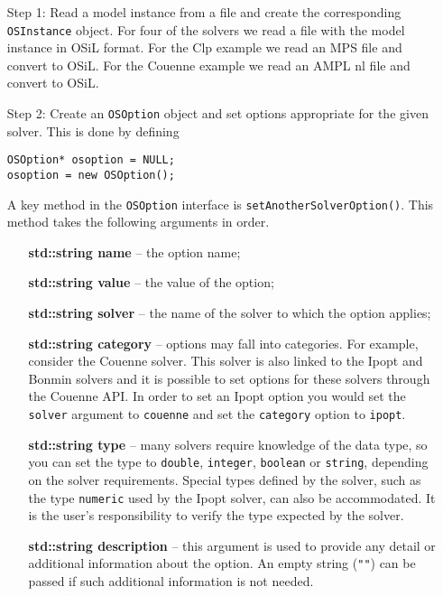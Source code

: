 \documentclass[11pt]{article}
\renewcommand{\_}{{\char"5F}}
\renewcommand{\{}{{\char"7B}}
\renewcommand{\}}{{\char"7D}}
\renewcommand{\^}{{\char"0D}}
\renewcommand{\'}{{\char"0D}}
\begin{document}
\begin{itemize}
\item[Step 1:]  Read a model instance from a file  and create the corresponding {\tt OSInstance} object.
For four of the solvers we read a file with the model instance in OSiL format. For the Clp example 
we read an MPS file and convert to OSiL. For the Couenne example we read an AMPL nl file and convert 
to OSiL.

\item[Step 2:]  Create an {\tt OSOption} object and set options appropriate for the given solver.   
This is done by defining

\begin{verbatim}
OSOption* osoption = NULL;
osoption = new OSOption();
\end{verbatim}

A key method in the {\tt OSOption} interface is {\tt setAnotherSolverOption()}.  This method 
takes the following arguments in order.

\begin{itemize}
\item[] {\bf std::string name} -- the option name;
\item[] {\bf std::string value}  -- the value of the option;
\item[] {\bf std::string solver} -- the name of the solver to which the option applies;
\item[] {\bf std::string category} -- options may fall into categories. For example, consider the  
Couenne solver.  This solver is also linked to the Ipopt and Bonmin solvers and  it is possible 
to set options for these solvers through the Couenne API. In order to set an Ipopt option 
you would set the {\tt solver} argument to {\tt couenne} and set the {\tt category} option 
to {\tt ipopt}.

\item[] {\bf std::string type} -- many solvers require knowledge of the data type, so you can set 
the type to {\tt double}, {\tt integer}, {\tt boolean} or {\tt string}, depending on the solver 
requirements. Special types defined by the solver, such as the type {\tt numeric} used by the
Ipopt solver, can also be accommodated. It is the user's responsibility to verify the type
expected by the solver.


\item[] {\bf std::string  description} -- this argument is used to provide any detail or 
additional information about the option. An empty string ({\tt""}) can be passed if such additional
information is not needed.
\end{itemize}


\end{itemize}
\end{document}

